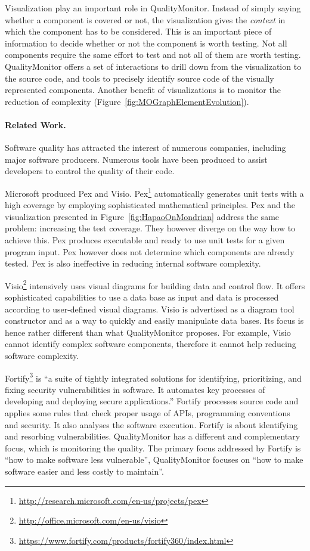 \documentclass[runningheads]{llncs}
\newcommand{\figref}[1]{Figure~\ref{fig:#1}}
\begin{document}
Visualization play an important role in QualityMonitor. Instead of simply saying whether a component is covered or not, the visualization gives the \emph{context} in which the component has to be considered. This is an important piece of information to decide whether or not the component is worth testing. Not all components require the same effort to test and not all of them are worth testing. QualityMonitor offers a set of interactions to drill down from the visualization to the source code, and tools to precisely identify source code of the visually represented components. Another benefit of visualizations is to monitor the reduction of complexity (\figref{MOGraphElementEvolution}).


\paragraph{Related Work.}
Software quality has attracted the interest of numerous companies, including major software producers. 
Numerous tools have been produced to assist developers to control the quality of their code. 

Microsoft produced Pex and Visio. 
Pex\footnote{\url{http://research.microsoft.com/en-us/projects/pex}} automatically generates unit tests with a high coverage by employing sophisticated mathematical principles. Pex and the visualization presented in \figref{HapaoOnMondrian} address the same problem: increasing the test coverage. They however diverge on the way how to achieve this. Pex produces executable and ready to use unit tests for a given program input. Pex however does not determine which components are already tested. Pex is also ineffective in reducing internal software complexity.

Visio\footnote{\url{http://office.microsoft.com/en-us/visio}} intensively uses visual diagrams for building data and control flow. It offers sophisticated capabilities to use a data base as input and data is processed according to user-defined visual diagrams. Visio is advertised as a diagram tool constructor and as a way to quickly and easily manipulate data bases. Its focus is hence rather different than what QualityMonitor proposes. For example, Visio cannot identify complex software components, therefore it cannot help reducing software complexity.

Fortify\footnote{\url{https://www.fortify.com/products/fortify360/index.html}} is ``a suite of tightly integrated solutions for identifying, prioritizing, and fixing security vulnerabilities in software. It automates key processes of developing and deploying secure applications.'' Fortify processes source code and applies some rules that check proper usage of APIs, programming conventions and security. It also analyses the software execution. Fortify is about identifying and resorbing vulnerabilities. QualityMonitor has a different and complementary focus, which is monitoring the quality. The primary focus addressed by Fortify is ``how to make software less vulnerable'', QualityMonitor focuses on ``how to make software easier and less costly to maintain''.
\end{document}
